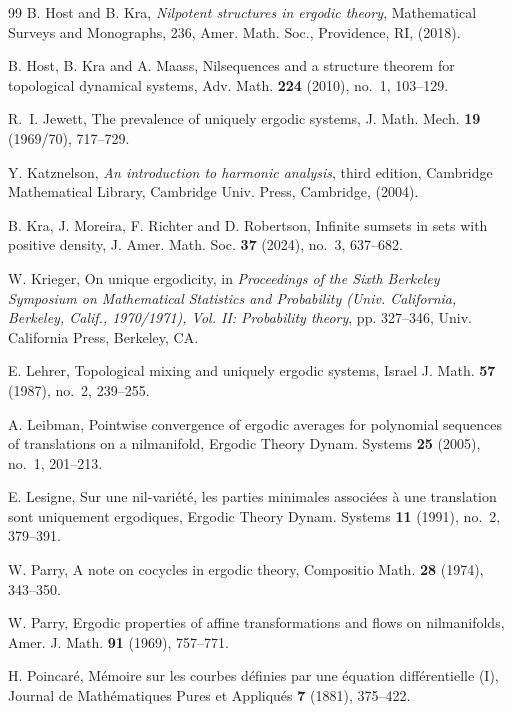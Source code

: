 \documentclass[12pt]{amsart}
\theoremstyle{definition}
\theoremstyle{plain}
\theoremstyle{definition}
\numberwithin{equation}{section}
\begin{document}
\begin{thebibliography}{99}
B. Host and B. Kra, {\it Nilpotent structures in ergodic theory}, Mathematical Surveys and Monographs, 236, Amer. Math. Soc., Providence, RI, (2018).

B. Host, B. Kra and A. Maass, Nilsequences and a structure theorem for topological dynamical systems, Adv. Math. {\bf 224} (2010), no.~1, 103--129.

R.~I. Jewett, The prevalence of uniquely ergodic systems, J. Math. Mech. {\bf 19} (1969/70), 717--729.


Y. Katznelson, {\it An introduction to harmonic analysis}, third edition, 
Cambridge Mathematical Library, Cambridge Univ. Press, Cambridge, (2004).


 B. Kra, J. Moreira, F. Richter and D. Robertson, Infinite sumsets in sets with positive density, J. Amer. Math. Soc. {\textbf{37}} (2024), no.~3, 637--682.

W. Krieger, On unique ergodicity, in {\it Proceedings of the Sixth Berkeley Symposium on Mathematical Statistics and Probability (Univ. California, Berkeley, Calif., 1970/1971), Vol. II: Probability theory}, pp. 327--346, Univ. California Press, Berkeley, CA.

E. Lehrer, Topological mixing and uniquely ergodic systems, Israel J. Math. {\textbf{57}} (1987), no.~2, 239--255.

 A. Leibman, Pointwise convergence of ergodic averages for polynomial sequences of translations on a nilmanifold, Ergodic Theory Dynam. Systems {\bf 25} (2005), no.~1, 201--213.

E. Lesigne, Sur une nil-vari\'et\'e, les parties minimales associ\'ees \`a{} une translation sont uniquement ergodiques, Ergodic Theory Dynam. Systems {\bf 11} (1991), no.~2, 379--391.

W. Parry, A note on cocycles in ergodic theory, Compositio Math. {\bf 28} (1974), 343--350.

W. Parry, Ergodic properties of affine transformations and flows on nilmanifolds, Amer. J. Math. {\bf 91} (1969), 757--771.

 H. Poincar\'e, M\'emoire sur les courbes d\'efinies par une \'equation diff\'erentielle (I), Journal de Math\'ematiques Pures et Appliqu\'es {\textbf{7}} (1881), 375--422.


\end{thebibliography}
\end{document}
